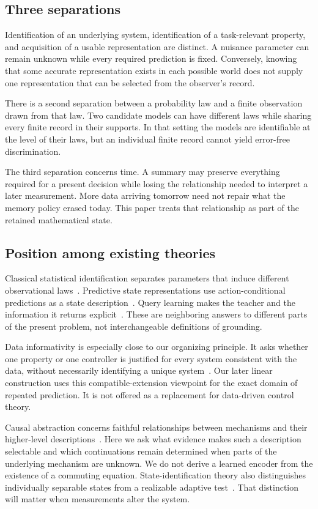 \documentclass[11pt,letterpaper]{article}
\theoremstyle{plain}
\theoremstyle{definition}
\begin{document}
\subsection{Three separations}
Identification of an underlying system, identification of a task-relevant property, and acquisition of a usable representation are distinct. A nuisance parameter can remain unknown while every required prediction is fixed. Conversely, knowing that some accurate representation exists in each possible world does not supply one representation that can be selected from the observer's record.

There is a second separation between a probability law and a finite observation drawn from that law. Two candidate models can have different laws while sharing every finite record in their supports. In that setting the models are identifiable at the level of their laws, but an individual finite record cannot yield error-free discrimination.

The third separation concerns time. A summary may preserve everything required for a present decision while losing the relationship needed to interpret a later measurement. More data arriving tomorrow need not repair what the memory policy erased today. This paper treats that relationship as part of the retained mathematical state.

\subsection{Position among existing theories}
Classical statistical identification separates parameters that induce different observational laws~\cite{rothenberg}. Predictive state representations use action-conditional predictions as a state description~\cite{psr}. Query learning makes the teacher and the information it returns explicit~\cite{angluin}. These are neighboring answers to different parts of the present problem, not interchangeable definitions of grounding.

Data informativity is especially close to our organizing principle. It asks whether one property or one controller is justified for every system consistent with the data, without necessarily identifying a unique system~\cite{informativity}. Our later linear construction uses this compatible-extension viewpoint for the exact domain of repeated prediction. It is not offered as a replacement for data-driven control theory.

Causal abstraction concerns faithful relationships between mechanisms and their higher-level descriptions~\cite{causal}. Here we ask what evidence makes such a description selectable and which continuations remain determined when parts of the underlying mechanism are unknown. We do not derive a learned encoder from the existence of a commuting equation. State-identification theory also distinguishes individually separable states from a realizable adaptive test~\cite{stateid}. That distinction will matter when measurements alter the system.
\end{document}
